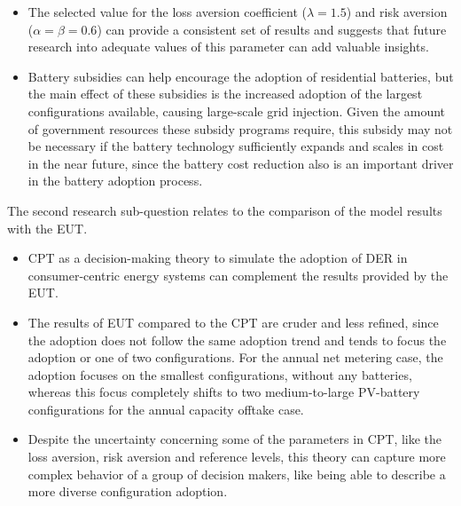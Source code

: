 \begin{itemize}
\item The selected value for the loss aversion coefficient ($\lambda = 1.5$) and risk aversion ($\alpha = \beta = 0.6$) can provide a consistent set of results and suggests that future research into adequate values of this parameter can add valuable insights. 
\item Battery subsidies can help encourage the adoption of residential batteries, but the main effect of these subsidies is the increased adoption of the largest configurations available, causing large-scale grid injection. Given the amount of government resources these subsidy programs require, this subsidy may not be necessary if the battery technology sufficiently expands and scales in cost in the near future, since the battery cost reduction also is an important driver in the battery adoption process. 
\end{itemize}
The second research sub-question relates to the comparison of the model results with the EUT.
\begin{itemize}
\item  CPT as a decision-making theory to simulate the adoption of DER in consumer-centric energy systems can complement the results provided by the EUT.
\item The results of EUT compared to the CPT are cruder and less refined, since the adoption does not follow the same adoption trend and tends to focus the adoption or one of two configurations. For the annual net metering case, the adoption focuses on the smallest configurations, without any batteries, whereas this focus completely shifts to two medium-to-large PV-battery configurations for the annual capacity offtake case. 
\item Despite the uncertainty concerning some of the parameters in CPT, like the loss aversion, risk aversion and reference levels, this theory can capture more complex behavior of a group of decision makers, like being able to describe a more diverse configuration adoption.
\end{itemize}
\newline \newline \noindent
